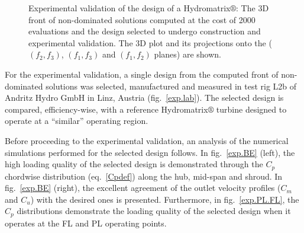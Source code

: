 \begin{figure}[h!]
\begin{minipage}[b]{0.5\linewidth}
\end{minipage}
\begin{minipage}[b]{0.5\linewidth}
 \centering
\end{minipage}
\caption{Experimental validation of the design of a Hydromatrix$\circledR$: The 3D front of non-dominated solutions computed at the cost of 2000 evaluations and the design selected to undergo construction and  experimental validation. The 3D plot and its projections onto the ($(f_2,f_3)$, $(f_1,f_3)$ and $(f_1,f_2)$ planes) are shown.}
\label{exp.pareto}
\end{figure}

For the experimental validation, a single design from the computed front of non-dominated solutions was selected, manufactured and measured in test rig L2b of Andritz Hydro GmbH in Linz, Austria (fig.\ \ref{exp.lab}). The selected design is compared, efficiency-wise, with a reference Hydromatrix$\circledR$ turbine designed to operate at a ``similar'' operating region.    

Before proceeding to the experimental validation, an analysis of the numerical simulations performed for the selected design follows. In fig.\ \ref{exp.BE} (left), the high loading quality of the selected design is demonstrated through the $C_p$ chordwise distribution (eq.\ \ref{Cpdef}) along the hub, mid-span and shroud. In fig.\ \ref{exp.BE} (right), the excellent agreement of the outlet velocity profiles ($C_m$ and $C_u$) with the desired ones is presented. Furthermore, in fig.\ \ref{exp.PL.FL}, the $C_p$ distributions demonstrate the loading quality of the selected design when it operates at the FL and PL operating points.    

